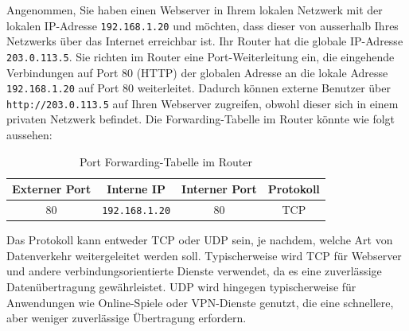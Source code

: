 \begin{myexample}
Angenommen, Sie haben einen Webserver in Ihrem lokalen Netzwerk mit der lokalen \gls{IP}-Adresse \texttt{192.168.1.20} und möchten, dass dieser von ausserhalb Ihres Netzwerks über das Internet erreichbar ist. Ihr Router hat die globale \gls{IP}-Adresse \texttt{203.0.113.5}. Sie richten im Router eine Port-Weiterleitung ein, die eingehende Verbindungen auf Port 80 (\gls{HTTP}) der globalen Adresse an die lokale Adresse \texttt{192.168.1.20} auf Port 80 weiterleitet. Dadurch können externe Benutzer über \texttt{http://203.0.113.5} auf Ihren Webserver zugreifen, obwohl dieser sich in einem privaten Netzwerk befindet. Die Forwarding-Tabelle im Router könnte wie folgt aussehen:
\begin{table}[H]
	\centering
	\begin{tabular}{c|c|c|c}
		\textbf{Externer Port} & \textbf{Interne IP} & \textbf{Interner Port} & \textbf{Protokoll} \\
		\midrule\midrule
		80 & \texttt{192.168.1.20} & 80 & \gls{TCP} \\
	\end{tabular}
	\caption{Port Forwarding-Tabelle im Router}
\end{table}

Das Protokoll kann entweder \gls{TCP} oder \gls{UDP} sein, je nachdem, welche Art von Datenverkehr weitergeleitet werden soll. Typischerweise wird \gls{TCP} für Webserver und andere verbindungsorientierte Dienste verwendet, da es eine zuverlässige Datenübertragung gewährleistet. \gls{UDP} wird hingegen typischerweise für Anwendungen wie Online-Spiele oder \gls{VPN}-Dienste genutzt, die eine schnellere, aber weniger zuverlässige Übertragung erfordern.
\end{myexample}


